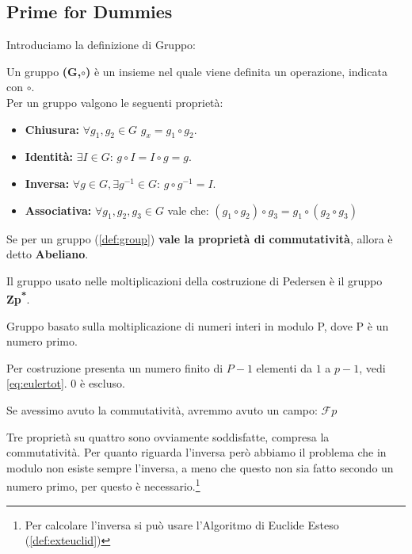 \subsection{Prime for Dummies}
Introduciamo la definizione di Gruppo:
\begin{definition}[Group]\label{def:group}
Un gruppo \textbf{(G,$\circ$)} è un insieme  nel quale viene definita un operazione, indicata con $\circ$.\\
Per un gruppo valgono le seguenti proprietà:
\begin{itemize}
    \item \textbf{Chiusura:} $\forall g_1,g_2\in{G}$ $g_x=g_1\circ g_2$.
    \item \textbf{Identità:} $\exists I\in{G}:\,g\circ I=I\circ g=g$.
    \item \textbf{Inversa:} $\forall g\in G, \exists g^{-1}\in G:\,g\circ g^{-1}=I$.
    \item \textbf{Associativa:} $\forall g_1,g_2,g_3 \in G$ vale che: $(g_1\circ g_2)\circ g_3=g_1\circ (g_2\circ g_3)$
\end{itemize}
\end{definition}
\begin{corollary}\label{cor:abelian}
Se per un gruppo (\cref{def:group}) \textbf{vale la proprietà di commutatività}, allora è detto \textbf{Abeliano}.
\end{corollary}
Il gruppo usato nelle moltiplicazioni della costruzione di Pedersen è il gruppo \textbf{Zp\textsuperscript{*}}.
\begin{definition}[Zp\textsuperscript{*}]
Gruppo basato sulla moltiplicazione di numeri interi in modulo P, dove P è un numero primo.
\begin{remark}
Per costruzione presenta un numero finito di $P-1$ elementi da $1$ a $p-1$, vedi \cref{eq:eulertot}. 0 è escluso.
\end{remark}
\end{definition}
\begin{note}
Se avessimo avuto la commutatività, avremmo avuto un campo: $\mathcal{F}p$
\end{note}
\begin{remark}
Tre proprietà su quattro sono ovviamente soddisfatte, compresa la commutatività. Per quanto riguarda l'inversa però abbiamo il problema che in modulo non esiste sempre l'inversa, a meno che questo non sia fatto secondo un numero primo, per questo è necessario.\footnote{Per calcolare l'inversa si può usare l'Algoritmo di Euclide Esteso (\cref{def:exteuclid})}
\end{remark}
